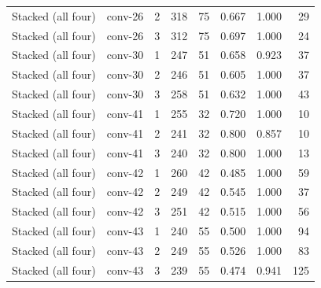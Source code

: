 \begin{longtable}{llrrrrrr}
Stacked (all four) & conv-26 & 2 & 318 & 75 & 0.667 & 1.000 & 29 \\
Stacked (all four) & conv-26 & 3 & 312 & 75 & 0.697 & 1.000 & 24 \\
Stacked (all four) & conv-30 & 1 & 247 & 51 & 0.658 & 0.923 & 37 \\
Stacked (all four) & conv-30 & 2 & 246 & 51 & 0.605 & 1.000 & 37 \\
Stacked (all four) & conv-30 & 3 & 258 & 51 & 0.632 & 1.000 & 43 \\
Stacked (all four) & conv-41 & 1 & 255 & 32 & 0.720 & 1.000 & 10 \\
Stacked (all four) & conv-41 & 2 & 241 & 32 & 0.800 & 0.857 & 10 \\
Stacked (all four) & conv-41 & 3 & 240 & 32 & 0.800 & 1.000 & 13 \\
Stacked (all four) & conv-42 & 1 & 260 & 42 & 0.485 & 1.000 & 59 \\
Stacked (all four) & conv-42 & 2 & 249 & 42 & 0.545 & 1.000 & 37 \\
Stacked (all four) & conv-42 & 3 & 251 & 42 & 0.515 & 1.000 & 56 \\
Stacked (all four) & conv-43 & 1 & 240 & 55 & 0.500 & 1.000 & 94 \\
Stacked (all four) & conv-43 & 2 & 249 & 55 & 0.526 & 1.000 & 83 \\
Stacked (all four) & conv-43 & 3 & 239 & 55 & 0.474 & 0.941 & 125 \\
\bottomrule
\end{longtable}
